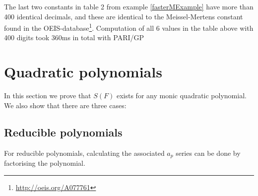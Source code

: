 \documentclass{article}
\theoremstyle{definition}
\theoremstyle{remark}
\begin{document}
The last two constants in table 2 from example \ref{fasterMExample} have more than 400 identical decimals,  and these are identical to the Meissel-Mertens constant found in the OEIS-database\footnote{\url{http://oeis.org/A077761}}. Computation of all 6 values in the table above with 400 digits took 360ms in total with PARI/GP
\newpage

\section{Quadratic polynomials}
In this section we prove that $S(F)$ exists for any monic quadratic polynomial. We also show that there are three cases:

\subsection{Reducible polynomials}
For reducible polynomials, calculating the associated $a_p$ series can be done by factorising the polynomial.
\end{document}
